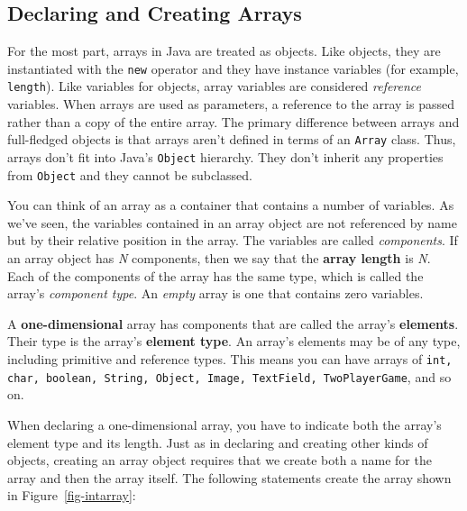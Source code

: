 \subsection{Declaring and Creating Arrays}
\noindent For the most part, arrays in Java are treated as objects.  
Like objects, they are instantiated with the {\tt new} operator 
and they have instance variables (for example, {\tt length}). Like
variables for objects, array variables are considered {\it reference}
variables.  When arrays are used as parameters, a reference to the
array is passed rather than a copy of the entire array.  The primary
difference between arrays and full-fledged objects is that arrays
aren't defined in terms of an {\tt Array} class.  Thus, arrays don't
fit into Java's {\tt Object} hierarchy.  They don't inherit any
properties from {\tt Object} and they cannot be subclassed.

You can think of an array as a container that contains a number of
variables.  As we've seen, the variables contained in an array object
are not referenced by name but by their relative position in the
array.  The variables are called {\it components}. If an array object
has {\it N} components, then we say that the
{\bf array length} is {\it N}. Each of the
components of the array has the same type, which is called the array's
{\it component type}.  An {\it empty}
array is one that contains zero variables.

A {\bf one-dimensional} array has
components that are called the array's {\bf elements}. Their type is the array's {\bf element type}. An array's elements may be of any type, including
primitive and reference types.  This means  you can have arrays of {\tt int,
char, boolean, String, Object, Image, TextField, TwoPlayerGame}, and so on.

When declaring a one-dimensional array, you have to indicate both the
array's element type and its length.  Just as in declaring and creating
other kinds of objects, creating an array object requires that we
create both a name for the array and then the array itself.   The following statements create the array shown
in Figure~\ref{fig-intarray}:

